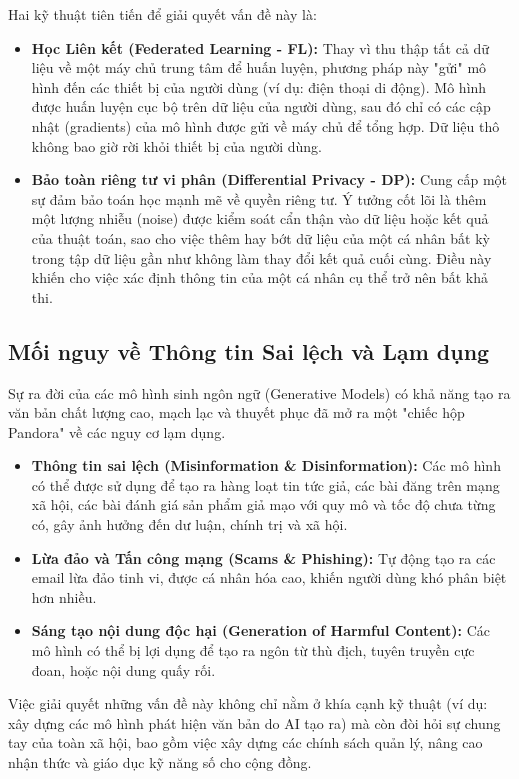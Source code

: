 Hai kỹ thuật tiên tiến để giải quyết vấn đề này là:
\begin{itemize}
    \item \textbf{Học Liên kết (Federated Learning - FL):} Thay vì thu thập tất cả dữ liệu về một máy chủ trung tâm để huấn luyện, phương pháp này "gửi" mô hình đến các thiết bị của người dùng (ví dụ: điện thoại di động). Mô hình được huấn luyện cục bộ trên dữ liệu của người dùng, sau đó chỉ có các cập nhật (gradients) của mô hình được gửi về máy chủ để tổng hợp. Dữ liệu thô không bao giờ rời khỏi thiết bị của người dùng.
    \item \textbf{Bảo toàn riêng tư vi phân (Differential Privacy - DP):} Cung cấp một sự đảm bảo toán học mạnh mẽ về quyền riêng tư. Ý tưởng cốt lõi là thêm một lượng nhiễu (noise) được kiểm soát cẩn thận vào dữ liệu hoặc kết quả của thuật toán, sao cho việc thêm hay bớt dữ liệu của một cá nhân bất kỳ trong tập dữ liệu gần như không làm thay đổi kết quả cuối cùng. Điều này khiến cho việc xác định thông tin của một cá nhân cụ thể trở nên bất khả thi.
\end{itemize}

\subsection{Mối nguy về Thông tin Sai lệch và Lạm dụng}
\label{ssec:thong_tin_sai_lech}

Sự ra đời của các mô hình sinh ngôn ngữ (Generative Models) có khả năng tạo ra văn bản chất lượng cao, mạch lạc và thuyết phục đã mở ra một "chiếc hộp Pandora" về các nguy cơ lạm dụng.
\begin{itemize}
    \item \textbf{Thông tin sai lệch (Misinformation \& Disinformation):} Các mô hình có thể được sử dụng để tạo ra hàng loạt tin tức giả, các bài đăng trên mạng xã hội, các bài đánh giá sản phẩm giả mạo với quy mô và tốc độ chưa từng có, gây ảnh hưởng đến dư luận, chính trị và xã hội.
    \item \textbf{Lừa đảo và Tấn công mạng (Scams \& Phishing):} Tự động tạo ra các email lừa đảo tinh vi, được cá nhân hóa cao, khiến người dùng khó phân biệt hơn nhiều.
    \item \textbf{Sáng tạo nội dung độc hại (Generation of Harmful Content):} Các mô hình có thể bị lợi dụng để tạo ra ngôn từ thù địch, tuyên truyền cực đoan, hoặc nội dung quấy rối.
\end{itemize}

Việc giải quyết những vấn đề này không chỉ nằm ở khía cạnh kỹ thuật (ví dụ: xây dựng các mô hình phát hiện văn bản do AI tạo ra) mà còn đòi hỏi sự chung tay của toàn xã hội, bao gồm việc xây dựng các chính sách quản lý, nâng cao nhận thức và giáo dục kỹ năng số cho cộng đồng.

